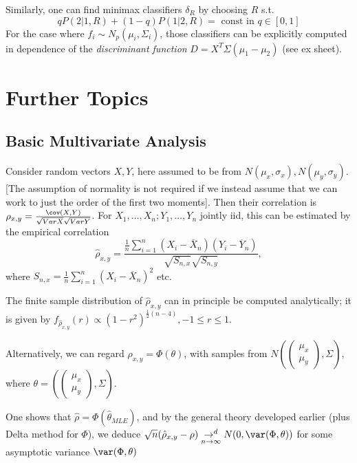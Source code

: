 \documentclass[a4paper]{article}
\begin{document}
Similarly, one can find minimax classifiers $\delta_{R}$ by choosing $R$ s.t. 
\[
	q P\left( 2|1,R \right) + (1-q)P\left( 1|2,R \right) = \text{ const in } q \in [0,1]
\] 
For the case where $f_i \sim N_p(\mu_i, \Sigma_i)$, those classifiers can be explicitly computed in dependence of the \textit{discriminant function} $D = X^{T} \Sigma (\mu_1 - \mu_2)$ (see ex sheet).

\section{Further Topics}

\subsection{Basic Multivariate Analysis}

Consider random vectors $X, Y$, here assumed to be from $N(\mu_x, \sigma_x), N(\mu_y, \sigma_y)$. [The assumption of normality is not required if we instead assume that we can work to just the order of the first two moments]. Then their correlation is $\rho_{x,y} = \frac{\cov(X,Y)}{\sqrt{VarX}\sqrt{VarY}}$. For $X_1, \ldots, X_n;Y_1,\ldots,Y_n$ jointly iid, this can be estimated by the empirical correlation
\[
	\hat{\rho}_{x,y} = \frac{\frac{1}{n}\sum_{i=1}^{n} (X_i - \overline{X}_n)(Y_i - \overline{Y}_n)}{\sqrt{S_{n,x}} \sqrt{S_{n,y}} }
,\] where $S_{n,x} = \frac{1}{n} \sum_{i=1}^{n}(X_i - \overline{X}_n)^2$ etc. 

The finite sample distribution of $\hat{\rho}_{x,y}$ can in principle be computed analytically; it is given by $f_{\hat{\rho}_{x,y}}(r) \propto (1-r^2)^{\frac{1}{2}(n-4)}, -1\le r\le 1 $.

Alternatively, we can regard $\rho_{x,y} = \Phi(\theta)$, with samples from $N\left(\begin{pmatrix} \mu_{x} \\ \mu_y \end{pmatrix}, \Sigma\right) $, where $\theta = \left( \begin{pmatrix} \mu_x \\ \mu_y \end{pmatrix}, \Sigma  \right) $. 

One shows that $\hat{\rho} = \Phi(\hat{\theta}_{MLE})$, and by the general theory developed earlier (plus Delta method for $\Phi $), we deduce $\sqrt{n} (\hat{\rho}_{x,y} - \rho) \underset{n\to \infty}{\to ^{d}} N(0, \var(\Phi, \theta))$ for some asymptotic variance $\var(\Phi, \theta)$
\end{document}

